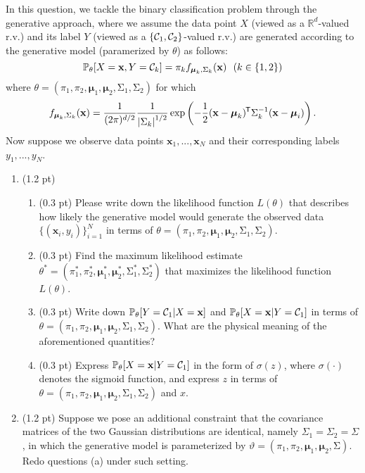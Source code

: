 \documentclass{article}
\newcommand{\real}{\mathbb{R}}
\newcommand*{\tran}{^{\mkern-1.5mu\mathsf{T}}}
\def\vecx{{\mathbf x}}
\def\vecmu{{\boldsymbol \mu}}
\def\matSigma{{\mathbf{\mathrm{\Sigma}}}}
\def\real{{\mathbb {R}}}
\def\prob{\mathbb{P}}
\def\calC{{\cal C}}
\begin{document}
In this question, we tackle the binary classification problem through the generative approach, where we assume the data point $X$ (viewed as a $\real^d$-valued r.v.) and its label $Y$ (viewed as a $\{\calC_1,\calC_2\}$-valued r.v.) are generated according to the generative model (paramerized by $\theta$) as follows:
\begin{equation}\label{eq:two_gaussian}
\prob_\theta [X = \vecx,Y = \calC_k] = \pi_k f_{\vecmu_k,\matSigma_k}(\vecx)~~ (k \in \{1,2\})
\end{equation}
%
where $\theta = (\pi_1,\pi_2,\vecmu_1,\vecmu_2,\matSigma_1,\matSigma_2)$ for which
\begin{equation*}
f_{\vecmu_k,\matSigma_k}(\vecx) = \frac{1}{(2\pi)^{d/2}}\frac{1}{\left| \matSigma_k \right|^{1/2}}\exp\left(-\frac{1}{2}(\vecx-\vecmu_k)\tran \matSigma_k^{-1}(\vecx-\vecmu_i)\right).
\end{equation*}
%
Now suppose we observe data points $\vecx_1,...,\vecx_N$ and their corresponding labels $y_1,...,y_N$.
\begin{enumerate}[label=(\alph*)]
\item (1.2 pt)
\begin{enumerate}[label=(\roman*)]
\item (0.3 pt) Please write down the likelihood function $L(\theta)$ that describes how likely the generative model would generate the observed data $\{(\vecx_i,y_i)\}_{i=1}^N$ in terms of $\theta = (\pi_1,\pi_2,\vecmu_1,\vecmu_2,\matSigma_1,\matSigma_2)$.
%
\item (0.3 pt) Find the maximum likelihood estimate $\theta^* = (\pi^*_1,\pi^*_2,\vecmu^*_1,\vecmu^*_2,\matSigma^*_1,\matSigma^*_2)$ that maximizes the likelihood function $L(\theta)$. %
%
\item (0.3 pt) Write down $\prob_\theta[Y=\calC_1|X=\vecx]$ and $\prob_\theta[X=\vecx|Y=\calC_1]$ in terms of $\theta = (\pi_1,\pi_2,\vecmu_1,\vecmu_2,\matSigma_1,\matSigma_2)$. What are the physical meaning of the aforementioned quantities?
%
\item (0.3 pt) Express $\prob_\theta[X=\vecx|Y=\calC_1]$ in the form of $\sigma(z)$, where $\sigma(\cdot)$ denotes the sigmoid function, and express $z$ in terms of $\theta = (\pi_1,\pi_2,\vecmu_1,\vecmu_2,\matSigma_1,\matSigma_2)$ and $x$.
\end{enumerate}
%
\item (1.2 pt) Suppose we pose an additional constraint that the covariance matrices of the two Gaussian distributions are identical, namely $\Sigma_1=\Sigma_2=\Sigma$, in which the generative model is parameterized by $\vartheta = (\pi_1,\pi_2,\vecmu_1,\vecmu_2,\matSigma)$. Redo questions (a) under such setting.
\end{enumerate}
\end{document}
